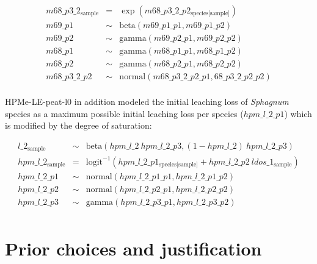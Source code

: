 \documentclass[
  12pt,
]{article}
\begin{document}
\begin{equation}
\begin{aligned}
m68\_p3\_2_{\text{sample}} & = & \exp(m68\_p3\_2\_p2_{\text{species[sample]}})\\
m69\_p1 & \sim & \text{beta}(m69\_p1\_p1, m69\_p1\_p2)\\
m69\_p2 & \sim & \text{gamma}(m69\_p2\_p1, m69\_p2\_p2)\\
m68\_p1 & \sim & \text{gamma}(m68\_p1\_p1, m68\_p1\_p2)\\
m68\_p2 & \sim & \text{gamma}(m68\_p2\_p1, m68\_p2\_p2)\\
m68\_p3\_2\_p2 & \sim & \text{normal}(m68\_p3\_2\_p2\_p1, 68\_p3\_2\_p2\_p2)\\
\label{eq:sup-model-2}
\end{aligned}
\end{equation}

HPMe-LE-peat-l0 in addition modeled the initial leaching loss of \emph{Sphagnum} species as a maximum possible initial leaching loss per species (\(hpm\_l\_2\_p1\)) which is modified by the degree of saturation:

\begin{equation}
\begin{aligned}
l\_2_{\text{sample}} & \sim & \text{beta}(hpm\_l\_2~hpm\_l\_2\_p3, (1 - hpm\_l\_2)~hpm\_l\_2\_p3)\\
hpm\_l\_2_{\text{sample}} & = & \text{logit}^{-1}(hpm\_l\_2\_p1_{\text{species[sample]}} + hpm\_l\_2\_p2~ldos\_1_{\text{sample}})\\
hpm\_l\_2\_p1 & \sim & \text{normal}(hpm\_l\_2\_p1\_p1, hpm\_l\_2\_p1\_p2)\\
hpm\_l\_2\_p2 & \sim & \text{normal}(hpm\_l\_2\_p2\_p1, hpm\_l\_2\_p2\_p2)\\
hpm\_l\_2\_p3 & \sim & \text{gamma}(hpm\_l\_2\_p3\_p1, hpm\_l\_2\_p3\_p2)\\
\label{eq:sup-model-3}
\end{aligned}
\end{equation}

\hypertarget{sup-2}{%
\section{Prior choices and justification}\label{sup-2}}
\end{document}

